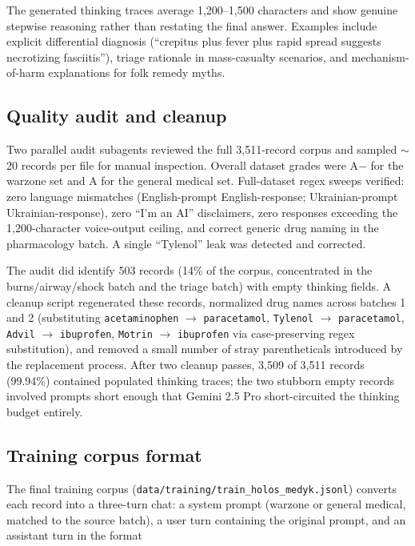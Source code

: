 \documentclass{article}
\theoremstyle{plain}
\theoremstyle{definition}
\theoremstyle{remark}
\begin{document}
The generated thinking traces average 1{,}200--1{,}500 characters and show genuine stepwise reasoning rather than restating the final answer. Examples include explicit differential diagnosis (``crepitus plus fever plus rapid spread suggests necrotizing fasciitis''), triage rationale in mass-casualty scenarios, and mechanism-of-harm explanations for folk remedy myths.

\subsection{Quality audit and cleanup}

Two parallel audit subagents reviewed the full 3{,}511-record corpus and sampled $\sim$20 records per file for manual inspection. Overall dataset grades were A$-$ for the warzone set and A for the general medical set. Full-dataset regex sweeps verified: zero language mismatches (English-prompt English-response; Ukrainian-prompt Ukrainian-response), zero ``I'm an AI'' disclaimers, zero responses exceeding the 1{,}200-character voice-output ceiling, and correct generic drug naming in the pharmacology batch. A single ``Tylenol'' leak was detected and corrected.

The audit did identify 503 records (14\% of the corpus, concentrated in the burns/airway/shock batch and the triage batch) with empty thinking fields. A cleanup script regenerated these records, normalized drug names across batches 1 and 2 (substituting \texttt{acetaminophen} $\rightarrow$ \texttt{paracetamol}, \texttt{Tylenol} $\rightarrow$ \texttt{paracetamol}, \texttt{Advil} $\rightarrow$ \texttt{ibuprofen}, \texttt{Motrin} $\rightarrow$ \texttt{ibuprofen} via case-preserving regex substitution), and removed a small number of stray parentheticals introduced by the replacement process. After two cleanup passes, 3{,}509 of 3{,}511 records (99.94\%) contained populated thinking traces; the two stubborn empty records involved prompts short enough that Gemini 2.5 Pro short-circuited the thinking budget entirely.

\subsection{Training corpus format}

The final training corpus (\texttt{data/training/train\_holos\_medyk.jsonl}) converts each record into a three-turn chat: a system prompt (warzone or general medical, matched to the source batch), a user turn containing the original prompt, and an assistant turn in the format
\end{document}

